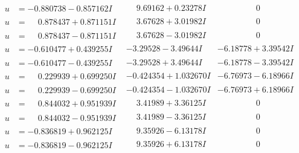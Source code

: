 \documentclass[1p]{elsarticle_modified}
\theoremstyle{definition}
\begin{document}
$$\begin{array}{c|c|c}
\begin{aligned}
u &= -0.880738 - 0.857162 I\end{aligned}
 & \phantom{-}9.69162 + 0.23278 I & \phantom{-0.000000 } 0 \\ \hline\begin{aligned}
u &= \phantom{-}0.878437 + 0.871151 I\end{aligned}
 & \phantom{-}3.67628 + 3.01982 I & \phantom{-0.000000 } 0 \\ \hline\begin{aligned}
u &= \phantom{-}0.878437 - 0.871151 I\end{aligned}
 & \phantom{-}3.67628 - 3.01982 I & \phantom{-0.000000 } 0 \\ \hline\begin{aligned}
u &= -0.610477 + 0.439255 I\end{aligned}
 & -3.29528 - 3.49644 I & -6.18778 + 3.39542 I \\ \hline\begin{aligned}
u &= -0.610477 - 0.439255 I\end{aligned}
 & -3.29528 + 3.49644 I & -6.18778 - 3.39542 I \\ \hline\begin{aligned}
u &= \phantom{-}0.229939 + 0.699250 I\end{aligned}
 & -0.424354 + 1.032670 I & -6.76973 - 6.18966 I \\ \hline\begin{aligned}
u &= \phantom{-}0.229939 - 0.699250 I\end{aligned}
 & -0.424354 - 1.032670 I & -6.76973 + 6.18966 I \\ \hline\begin{aligned}
u &= \phantom{-}0.844032 + 0.951939 I\end{aligned}
 & \phantom{-}3.41989 + 3.36125 I & \phantom{-0.000000 } 0 \\ \hline\begin{aligned}
u &= \phantom{-}0.844032 - 0.951939 I\end{aligned}
 & \phantom{-}3.41989 - 3.36125 I & \phantom{-0.000000 } 0 \\ \hline\begin{aligned}
u &= -0.836819 + 0.962125 I\end{aligned}
 & \phantom{-}9.35926 - 6.13178 I & \phantom{-0.000000 } 0 \\ \hline\begin{aligned}
u &= -0.836819 - 0.962125 I\end{aligned}
 & \phantom{-}9.35926 + 6.13178 I & \phantom{-0.000000 } 0 \\ \hline\begin{aligned}

\end{aligned}
\end{array}$$
\end{document}
